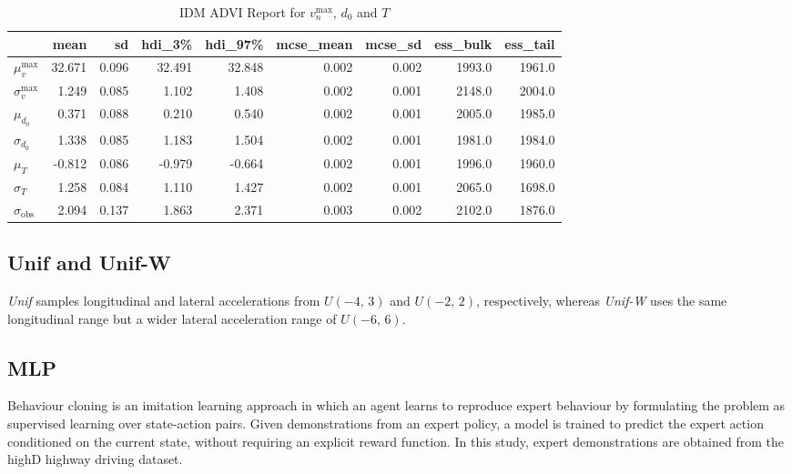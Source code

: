 \documentclass[journal]{IEEEtran}
\begin{document}
\begin{table}[th]
    \centering
    \caption{IDM ADVI Report for $v_n^{\max}$, $d_0$ and $T$}
    \label{tab:IDM}
    \begin{tabular}{lrrrrrrrr}
        \toprule
        {} & mean & sd & hdi\_3\% & hdi\_97\% & mcse\_mean & mcse\_sd & ess\_bulk & ess\_tail \\
        \midrule
        $\mu_v^{\max}$    & 32.671 & 0.096 & 32.491 & 32.848 & 0.002 & 0.002 & 1993.0 & 1961.0 \\
        $\sigma_{v}^{\max}$ &  1.249 & 0.085 &  1.102 &  1.408 & 0.002 & 0.001 & 2148.0 & 2004.0 \\
        $\mu_{d_0}$    &  0.371 & 0.088 &  0.210 &  0.540 & 0.002 & 0.001 & 2005.0 & 1985.0 \\
        $\sigma_{d_0}$ &  1.338 & 0.085 &  1.183 &  1.504 & 0.002 & 0.001 & 1981.0 & 1984.0 \\
        $\mu_{T}$     & -0.812 & 0.086 & -0.979 & -0.664 & 0.002 & 0.001 & 1996.0 & 1960.0 \\
        $\sigma_{T}$  &  1.258 & 0.084 &  1.110 &  1.427 & 0.002 & 0.001 & 2065.0 & 1698.0 \\
        $\sigma_{\text{obs}}$&  2.094 & 0.137 &  1.863 &  2.371 & 0.003 & 0.002 & 2102.0 & 1876.0 \\
        \bottomrule
    \end{tabular}
\end{table}

\subsection{Unif and Unif-W}

\textit{Unif} samples longitudinal and lateral accelerations from $U(-4,\,3)$ and $U(-2,\,2)$, respectively, whereas \textit{Unif-W} uses the same longitudinal range but a wider lateral acceleration range of $U(-6,\,6)$.

\subsection{MLP}\label{subsec:mlp-highway}

Behaviour cloning is an imitation learning approach in which an agent learns to reproduce expert behaviour by formulating the problem as supervised learning over state-action pairs. Given demonstrations from an expert policy, a model is trained to predict the expert action conditioned on the current state, without requiring an explicit reward function. In this study, expert demonstrations are obtained from the highD highway driving dataset.
\end{document}
